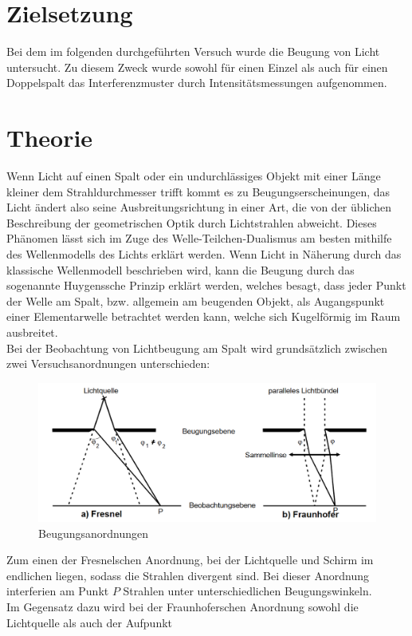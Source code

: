 \section{Zielsetzung}
Bei dem im folgenden durchgeführten Versuch wurde die Beugung von Licht untersucht. Zu diesem Zweck wurde sowohl für einen Einzel als 
auch für einen Doppelspalt das Interferenzmuster durch Intensitätsmessungen aufgenommen.
\section{Theorie}
Wenn Licht auf einen Spalt oder ein undurchlässiges Objekt mit einer Länge kleiner dem Strahldurchmesser trifft kommt es zu Beugungserscheinungen,
das Licht ändert also seine Ausbreitungsrichtung in einer Art, die von der üblichen Beschreibung der geometrischen Optik durch Lichtstrahlen
abweicht. Dieses Phänomen lässt sich im Zuge des Welle-Teilchen-Dualismus am besten mithilfe des Wellenmodells des Lichts erklärt werden.
Wenn Licht in Näherung durch das klassische Wellenmodell beschrieben wird, kann die Beugung durch das sogenannte Huygenssche Prinzip erklärt werden,
welches besagt, dass jeder Punkt der Welle am Spalt, bzw. allgemein am beugenden Objekt, als Augangspunkt einer Elementarwelle betrachtet werden kann, welche 
sich Kugelförmig im Raum ausbreitet. \\
Bei der Beobachtung von Lichtbeugung am Spalt wird grundsätzlich zwischen zwei Versuchsanordnungen unterschieden: 
\begin{figure} [h]
    \centering
    \includegraphics[width=14cm, keepaspectratio]{Beugungsanordnungen}
    \caption{Beugungsanordnungen}
 \end{figure}
Zum einen der Fresnelschen Anordnung, bei der
Lichtquelle und Schirm im endlichen liegen, sodass die Strahlen divergent sind. Bei dieser Anordnung interferien am Punkt $P$ Strahlen unter
unterschiedlichen Beugungswinkeln. \\ Im Gegensatz dazu wird bei der Fraunhoferschen Anordnung sowohl die Lichtquelle als auch der Aufpunkt
